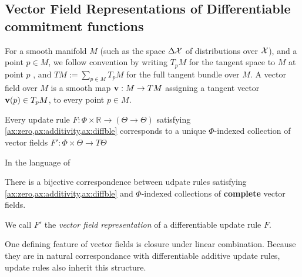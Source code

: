 \documentclass{article}
\def\cofunc{commitment function}
\begin{document}
\subsection{Vector Field Representations of Differentiable \cofunc s}
	\label{sec:vecrep}
For a smooth manifold $M$
(such as the space $\Delta \mathcal X$ of distributions over $\mathcal X$),
and a point $p \in M$, we follow convention by writing $T_p M$ for the tangent space to $M$ at point $p$ \parencite{lee2013smooth}, and %
$TM := \sum_{p \in M} T_p M$ for the full tangent bundle over $M$.
%
A vector field over $M$ is a smooth map $\mathbf{v} : M \to T M$ assigning a tangent vector $\mathbf{v}(p) \in T_p M$, to every point $p \in M$.

\begin{theorem}
	Every update rule $F : \Phi \times \mathbb R \to (\Theta  \to \Theta)$
	satisfying \cref{ax:zero,ax:additivity,ax:diffble} corresponds to a unique
	$\Phi$-indexed collection of vector fields
		$F' : \Phi \times \Theta \to T\Theta$
\end{theorem}

In the language of 

\begin{coro}\label{thm:vecrep}
	There is a bijective correspondence between udpate rules satisfying \cref{ax:zero,ax:additivity,ax:diffble} and $\Phi$-indexed collections of \textbf{complete} vector fields.
\end{coro}

We call $F'$ the \emph{vector field representation} of a differentiable update rule $F$.

One defining feature of vector fields is closure under linear
	combination.
Because they are in natural correspondance with differentiable additive update rules, update rules also inherit this structure.
\end{document}
